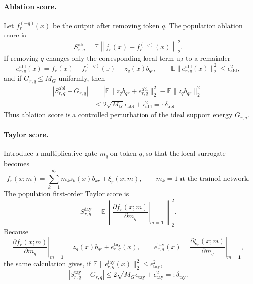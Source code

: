 \documentclass{article}
\begin{document}
\paragraph{Ablation score.}
Let \(f_r^{(-q)}(x)\) be the output after removing token \(q\). The population ablation score is
\begin{equation}
S^{\mathrm{abl}}_{r,q}=
\mathbb E\left\|f_r(x)-f_r^{(-q)}(x)\right\|_2^2 .
\label{eq:population_ablation_score_lgamma}
\end{equation}
If removing \(q\) changes only the corresponding local term up to a remainder
\begin{equation}
e^{\mathrm{abl}}_{r,q}(x)=
f_r(x)-f_r^{(-q)}(x)-z_q(x)b_{qr},
\qquad
\mathbb E\|e^{\mathrm{abl}}_{r,q}(x)\|_2^2\le \epsilon_{\mathrm{abl}}^2,
\end{equation}
and if \(G_{r,q}\le M_G\) uniformly, then
\begin{align}
\left|S^{\mathrm{abl}}_{r,q}-G_{r,q}\right|
&=
\left|\mathbb E\|z_qb_{qr}+e^{\mathrm{abl}}_{r,q}\|_2^2-
\mathbb E\|z_qb_{qr}\|_2^2\right| \\
&\le
2\sqrt{M_G}\epsilon_{\mathrm{abl}}+
\epsilon_{\mathrm{abl}}^2
=:\delta_{\mathrm{abl}} .
\label{eq:ablation_energy_bound_lgamma}
\end{align}
Thus ablation score is a controlled perturbation of the ideal support energy \(G_{r,q}\).

\paragraph{Taylor score.}
Introduce a multiplicative gate \(m_q\) on token \(q\), so that the local surrogate becomes
\begin{equation}
f_r(x;m)=\sum_{k=1}^{d_\ell}m_kz_k(x)b_{kr}+\xi_r(x;m),
\qquad m_k=1\ \text{at the trained network.}
\end{equation}
The population first-order Taylor score is
\begin{equation}
S^{\mathrm{tay}}_{r,q}=
\mathbb E\left\|
\left.
\frac{\partial f_r(x;m)}{\partial m_q}
\right|_{m=\mathbf 1}
\right\|_2^2 .
\label{eq:population_taylor_score_lgamma}
\end{equation}
Because
\begin{equation}
\left.
\frac{\partial f_r(x;m)}{\partial m_q}
\right|_{m=\mathbf 1}
=
z_q(x)b_{qr}+e^{\mathrm{tay}}_{r,q}(x),
\qquad
e^{\mathrm{tay}}_{r,q}(x)=
\left.
\frac{\partial \xi_r(x;m)}{\partial m_q}
\right|_{m=\mathbf 1},
\end{equation}
the same calculation gives, if \(\mathbb E\|e^{\mathrm{tay}}_{r,q}(x)\|_2^2\le\epsilon_{\mathrm{tay}}^2\),
\begin{equation}
\left|S^{\mathrm{tay}}_{r,q}-G_{r,q}\right|
\le
2\sqrt{M_G}\epsilon_{\mathrm{tay}}+
\epsilon_{\mathrm{tay}}^2
=:\delta_{\mathrm{tay}} .
\label{eq:taylor_energy_bound_lgamma}
\end{equation}
\end{document}
